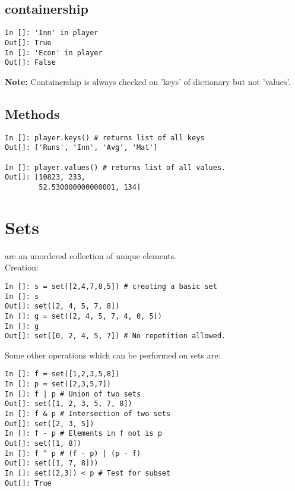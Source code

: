 \documentclass[12pt]{article}
\begin{document}
\subsection{containership}
\begin{lstlisting}
In []: 'Inn' in player
Out[]: True
In []: 'Econ' in player
Out[]: False
\end{lstlisting}
\textbf{Note:} Containership is always checked on 'keys' of dictionary but not 'values'.\\
\subsection{Methods}
\begin{lstlisting}
In []: player.keys() # returns list of all keys
Out[]: ['Runs', 'Inn', 'Avg', 'Mat']

In []: player.values() # returns list of all values.
Out[]: [10823, 233, 
        52.530000000000001, 134]  
\end{lstlisting}
\section{Sets}
are an unordered collection of unique elements.\\
Creation:
\begin{lstlisting}
In []: s = set([2,4,7,8,5]) # creating a basic set
In []: s
Out[]: set([2, 4, 5, 7, 8])
In []: g = set([2, 4, 5, 7, 4, 0, 5])
In []: g
Out[]: set([0, 2, 4, 5, 7]) # No repetition allowed.
\end{lstlisting}
Some other operations which can be performed on sets are:
\begin{lstlisting}
In []: f = set([1,2,3,5,8])
In []: p = set([2,3,5,7])
In []: f | p # Union of two sets
Out[]: set([1, 2, 3, 5, 7, 8])
In []: f & p # Intersection of two sets
Out[]: set([2, 3, 5])
In []: f - p # Elements in f not is p
Out[]: set([1, 8])
In []: f ^ p # (f - p) | (p - f)
Out[]: set([1, 7, 8])) 
In []: set([2,3]) < p # Test for subset
Out[]: True
\end{lstlisting}
\end{document}
